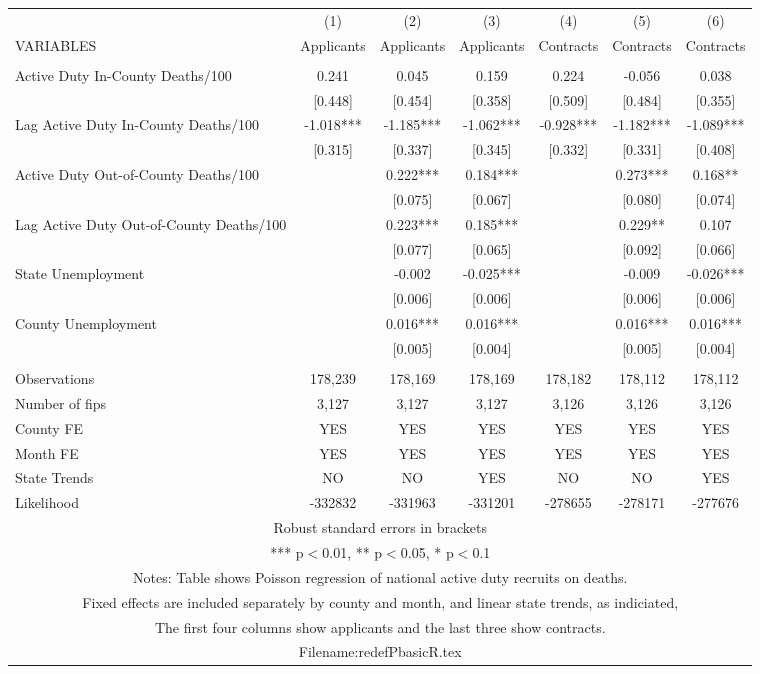 \documentclass[]{article}
\begin{document}
\begin{tabular}{lcccccc} \hline
 & (1) & (2) & (3) & (4) & (5) & (6) \\
VARIABLES & Applicants & Applicants & Applicants & Contracts & Contracts & Contracts \\ \hline
 &  &  &  &  &  &  \\
Active Duty In-County Deaths/100 & 0.241 & 0.045 & 0.159 & 0.224 & -0.056 & 0.038 \\
 & [0.448] & [0.454] & [0.358] & [0.509] & [0.484] & [0.355] \\
Lag Active Duty In-County Deaths/100 & -1.018*** & -1.185*** & -1.062*** & -0.928*** & -1.182*** & -1.089*** \\
 & [0.315] & [0.337] & [0.345] & [0.332] & [0.331] & [0.408] \\
Active Duty Out-of-County Deaths/100 &  & 0.222*** & 0.184*** &  & 0.273*** & 0.168** \\
 &  & [0.075] & [0.067] &  & [0.080] & [0.074] \\
Lag Active Duty Out-of-County Deaths/100 &  & 0.223*** & 0.185*** &  & 0.229** & 0.107 \\
 &  & [0.077] & [0.065] &  & [0.092] & [0.066] \\
State Unemployment &  & -0.002 & -0.025*** &  & -0.009 & -0.026*** \\
 &  & [0.006] & [0.006] &  & [0.006] & [0.006] \\
County Unemployment &  & 0.016*** & 0.016*** &  & 0.016*** & 0.016*** \\
 &  & [0.005] & [0.004] &  & [0.005] & [0.004] \\
 &  &  &  &  &  &  \\
Observations & 178,239 & 178,169 & 178,169 & 178,182 & 178,112 & 178,112 \\
Number of fips & 3,127 & 3,127 & 3,127 & 3,126 & 3,126 & 3,126 \\
County FE & YES & YES & YES & YES & YES & YES \\
Month FE & YES & YES & YES & YES & YES & YES \\
State Trends & NO & NO & YES & NO & NO & YES \\
 Likelihood & -332832 & -331963 & -331201 & -278655 & -278171 & -277676 \\ \hline
\multicolumn{7}{c}{ Robust standard errors in brackets} \\
\multicolumn{7}{c}{ *** p$<$0.01, ** p$<$0.05, * p$<$0.1} \\
\multicolumn{7}{c}{ Notes: Table shows Poisson regression of national active duty recruits on deaths.} \\
\multicolumn{7}{c}{ Fixed effects are included separately by county and month, and linear state trends, as indiciated,} \\
\multicolumn{7}{c}{ The first four columns show applicants and the last three show contracts.} \\
\multicolumn{7}{c}{ Filename:redefPbasicR.tex} \\
\end{tabular}
\end{document}

